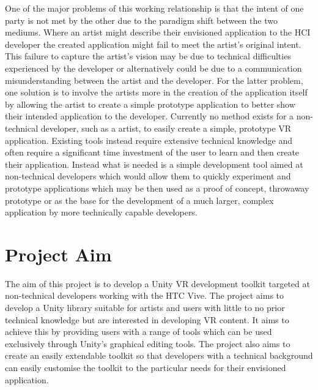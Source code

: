 \documentclass{l4proj}
\begin{document}
One of the major problems of this working relationship is that the intent of one party is not met by the other due to the paradigm shift between the two mediums. Where an artist might describe their envisioned application to the HCI developer the created application might fail to meet the artist's original intent. This failure to capture the artist's vision may be due to technical difficulties experienced by the developer or alternatively could be due to a communication misunderstanding between the artist and the developer. For the latter problem, one solution is to involve the artists more in the creation of the application itself by allowing the artist to create a simple prototype application to better show their intended application to the developer. Currently no method exists for a non-technical developer, such as a artist, to easily create a simple, prototype VR application. Existing tools instead require extensive technical knowledge and often require a significant time investment of the user to learn and then create their application. Instead what is needed is a simple development tool aimed at non-technical developers which would allow them to quickly experiment and prototype applications which may be then used as a proof of concept, throwaway prototype or as the base for the development of a much larger, complex application by more technically capable developers.

\section{Project Aim}
\label{sec:introductionprojectaims}
The aim of this project is to develop a Unity VR development toolkit targeted at non-technical developers working with the HTC Vive. The project aims to develop a Unity library suitable for artists and users with little to no prior technical knowledge but are interested in developing VR content. It aims to achieve this by providing users with a range of tools which can be used exclusively through Unity’s graphical editing tools. The project also aims to create an easily extendable toolkit so that developers with a technical background can easily customise the toolkit to the particular needs for their envisioned application.
\end{document}
